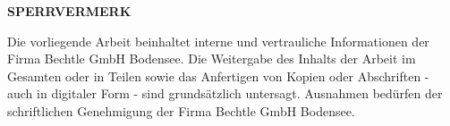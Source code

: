 \thispagestyle{empty}
\begin{center}
	\LARGE{\textbf{SPERRVERMERK}} \\
\end{center}
\begin{center}
	\textnormal{Die vorliegende Arbeit beinhaltet interne und vertrauliche Informationen der Firma Bechtle GmbH Bodensee.
		Die Weitergabe des Inhalts der Arbeit im Gesamten oder in Teilen sowie das Anfertigen
		von Kopien oder Abschriften - auch in digitaler Form - sind grundsätzlich untersagt.
		Ausnahmen bedürfen der schriftlichen Genehmigung der Firma  Bechtle GmbH Bodensee.}
\end{center}

